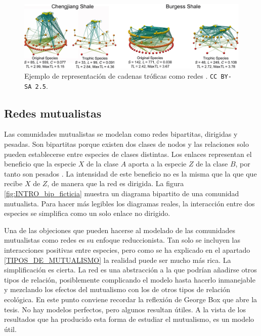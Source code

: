 \begin{figure}[h!]
\centering
\includegraphics[scale=0.75]{Figures/INTRO_Chengjiang_and_Burgess_Shale_1.png}
\caption{Ejemplo de representación de cadenas tróficas como redes \cite{dunne2008compilation}. \small{\texttt{CC BY-SA 2.5}}.}
\label{fig:INTRO_Chengjiang_and_Burgess_Shale_1}
\end{figure}


\subsection{Redes mutualistas}

Las comunidades mutualistas se modelan como redes bipartitas, dirigidas y pesadas. Son bipartitas porque existen dos clases de nodos y las relaciones solo pueden establecerse entre especies de clases distintas. Los enlaces representan el beneficio que la especie $X$ de la clase $A$ aporta a la especie $Z$ de la clase $B$, por tanto son pesados \cite{barrat2004architecture}. La intensidad de este beneficio no es la misma que la que que recibe $X$ de $Z$, de manera que la red es dirigida. La figura \ref{fig:INTRO_bip_ficticia} muestra un diagrama bipartito de una comunidad mutualista. Para hacer más legibles los diagramas reales, la interacción entre dos especies se simplifica como un solo enlace no dirigido.

Una de las objeciones que pueden hacerse al modelado de las comunidades mutualistas como redes es su enfoque reduccionista. Tan solo se incluyen las interacciones positivas entre especies, pero como se ha explicado en el apartado \ref{TIPOS_DE_MUTUALISMO} la realidad puede ser mucho más rica. La simplificación es cierta. La red es una abstracción a la que podrían añadirse otros tipos de relación, posiblemente complicando el modelo hasta hacerlo inmanejable y mezclando los efectos del mutualismo con los de otros tipos de relación ecológica. En este punto conviene recordar la reflexión de George Box que abre la tesis. No hay modelos perfectos, pero algunos resultan útiles. A la vista de los resultados que ha producido esta forma de estudiar el mutualismo, es un modelo útil.

